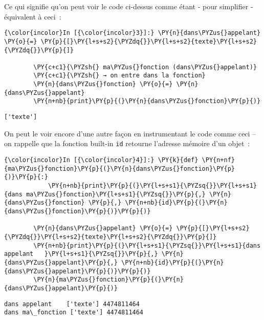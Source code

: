     Ce qui signifie qu'on peut voir le code ci-dessus comme étant - pour
simplifier - équivalent à ceci~:

    \begin{Verbatim}[commandchars=\\\{\},frame=single,framerule=0.3mm,rulecolor=\color{cellframecolor}]
{\color{incolor}In [{\color{incolor}3}]:} \PY{n}{dans\PYZus{}appelant} \PY{o}{=} \PY{p}{[}\PY{l+s+s2}{\PYZdq{}}\PY{l+s+s2}{texte}\PY{l+s+s2}{\PYZdq{}}\PY{p}{]}
        
        \PY{c+c1}{\PYZsh{} ma\PYZus{}fonction (dans\PYZus{}appelant)}
        \PY{c+c1}{\PYZsh{} → on entre dans la fonction}
        \PY{n}{dans\PYZus{}fonction} \PY{o}{=} \PY{n}{dans\PYZus{}appelant}
        \PY{n+nb}{print}\PY{p}{(}\PY{n}{dans\PYZus{}fonction}\PY{p}{)}
\end{Verbatim}


    \begin{Verbatim}[commandchars=\\\{\},frame=single,framerule=0.3mm,rulecolor=\color{cellframecolor}]
['texte']
\end{Verbatim}

    On peut le voir encore d'une autre façon en instrumentant le code comme
ceci -- on rappelle que la fonction built-in \texttt{id} retourne
l'adresse mémoire d'un objet~:

    \begin{Verbatim}[commandchars=\\\{\},frame=single,framerule=0.3mm,rulecolor=\color{cellframecolor}]
{\color{incolor}In [{\color{incolor}4}]:} \PY{k}{def} \PY{n+nf}{ma\PYZus{}fonction}\PY{p}{(}\PY{n}{dans\PYZus{}fonction}\PY{p}{)}\PY{p}{:}
            \PY{n+nb}{print}\PY{p}{(}\PY{l+s+s1}{\PYZsq{}}\PY{l+s+s1}{dans ma\PYZus{}fonction}\PY{l+s+s1}{\PYZsq{}}\PY{p}{,} \PY{n}{dans\PYZus{}fonction} \PY{p}{,} \PY{n+nb}{id}\PY{p}{(}\PY{n}{dans\PYZus{}fonction}\PY{p}{)}\PY{p}{)}
            
        \PY{n}{dans\PYZus{}appelant} \PY{o}{=} \PY{p}{[}\PY{l+s+s2}{\PYZdq{}}\PY{l+s+s2}{texte}\PY{l+s+s2}{\PYZdq{}}\PY{p}{]}
        \PY{n+nb}{print}\PY{p}{(}\PY{l+s+s1}{\PYZsq{}}\PY{l+s+s1}{dans appelant   }\PY{l+s+s1}{\PYZsq{}}\PY{p}{,} \PY{n}{dans\PYZus{}appelant}\PY{p}{,} \PY{n+nb}{id}\PY{p}{(}\PY{n}{dans\PYZus{}appelant}\PY{p}{)}\PY{p}{)}
        \PY{n}{ma\PYZus{}fonction}\PY{p}{(}\PY{n}{dans\PYZus{}appelant}\PY{p}{)}
\end{Verbatim}


    \begin{Verbatim}[commandchars=\\\{\},frame=single,framerule=0.3mm,rulecolor=\color{cellframecolor}]
dans appelant    ['texte'] 4474811464
dans ma\_fonction ['texte'] 4474811464
\end{Verbatim}


